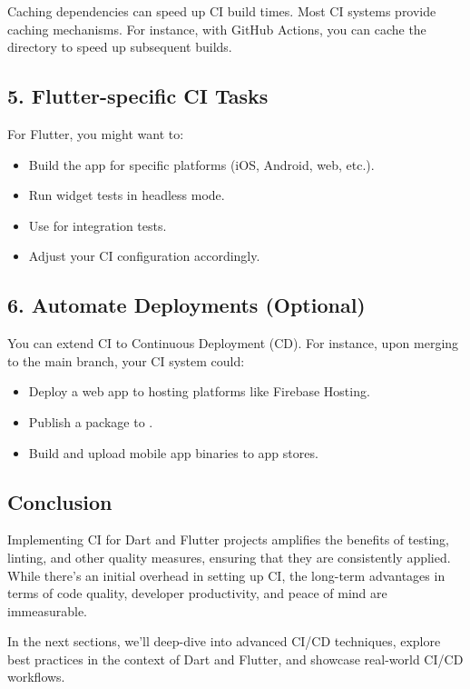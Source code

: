 Caching dependencies can speed up CI build times. Most CI systems provide caching mechanisms. For instance, with GitHub Actions, you can cache the  directory to speed up subsequent builds.

\subsection*{5. Flutter-specific CI Tasks}

For Flutter, you might want to:

\begin{itemize}
 \item Build the app for specific platforms (iOS, Android, web, etc.).
 \item Run widget tests in headless mode.
 \item Use  for integration tests.
 \item Adjust your CI configuration accordingly.
\end{itemize}

\subsection*{6. Automate Deployments (Optional)}

You can extend CI to Continuous Deployment (CD). For instance, upon merging to the main branch, your CI system could:

\begin{itemize}
 \item Deploy a web app to hosting platforms like Firebase Hosting.
 \item  Publish a package to .
 \item Build and upload mobile app binaries to app stores.
\end{itemize}


\subsection*{Conclusion}

Implementing CI for Dart and Flutter projects amplifies the benefits of testing, linting, and other quality measures, ensuring that they are consistently applied. While there's an initial overhead in setting up CI, the long-term advantages in terms of code quality, developer productivity, and peace of mind are immeasurable.

In the next sections, we'll deep-dive into advanced CI/CD techniques, explore best practices in the context of Dart and Flutter, and showcase real-world CI/CD workflows.

